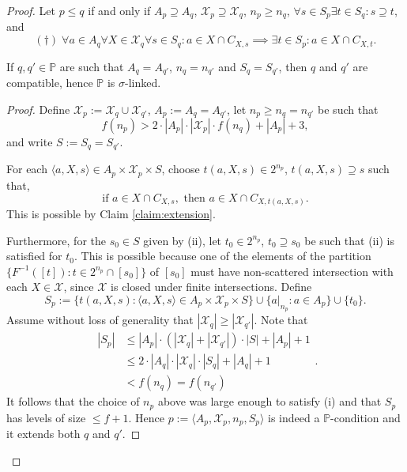 \documentclass[10pt,a4paper]{amsart}
\begin{document}
\begin{proof}
Let $p \leq q$ if and only if $A_p \supseteq A_q$, $\mathcal{X}_p \supseteq \mathcal{X}_q$, $n_p \geq n_q$, $\forall s \in S_p \exists t \in S_q: s \supseteq t$, and
\[(\dagger)\; \forall a \in A_q \forall X \in \mathcal{X}_q \forall s \in S_q: a \in X \cap C_{X,s} \implies \exists t \in S_p: a \in X \cap C_{X,t}.\]

\begin{claim}\label{claim:linked}
	If $q,q' \in \mathbb{P}$ are such that $A_q =A_{q'}$, $n_q=n_{q'}$ and $S_q=S_{q'}$, then $q$ and $q'$ are compatible, hence $\mathbb{P}$ is $\sigma$-linked.
\end{claim}

\begin{proof}
Define $\mathcal{X}_{p}:=\mathcal{X}_{q} \cup \mathcal{X}_{q'}$, $A_p:=A_q=A_{q'}$, let $n_p \geq n_q=n_{q'}$ be such that
\[f(n_p)> 2 \cdot |A_p|\cdot |\mathcal{X}_p| \cdot f(n_q) + |A_p| + 3,\]
and write $S:=S_q=S_{q'}$.

For each $\langle a, X, s\rangle \in A_p \times \mathcal{X}_p \times S$, choose $t(a,X,s)\in 2^{n_p}$, $t(a,X,s) \supseteq s$ such that,
\[\text{if } a \in X \cap C_{X,s}, \text{ then } a \in X \cap C_{X, t(a,X,s)}.\]
This is possible by Claim \ref{claim:extension}.

Furthermore, for the $s_0 \in S$ given by (ii), let $t_0 \in 2^{n_p}$,  $t_0 \supseteq s_0$ be such that (ii) is satisfied for $t_0$. This is possible because one of the elements of the partition $\{F^{-1}([t]): t \in 2^{n_p}\cap [s_0]\}$ of $[s_0]$ must have non-scattered intersection with each $X \in \mathcal{X}$, since $\mathcal{X}$ is closed under finite intersections. Define
\[S_p:=\{t(a,X,s): \langle a, X, s\rangle \in A_p \times \mathcal{X}_p \times S\} \cup \{a|_{n_p}: a \in A_p\} \cup \{t_0\}.\]
Assume without loss of generality that $|\mathcal{X}_q|\geq |\mathcal{X}_{q'}|$. Note that
\[\begin{aligned}
	|S_p|&\leq |A_p| \cdot (|\mathcal{X}_q|+|\mathcal{X}_{q'}|)\cdot |S|+|A_p|+1 \\
	&\leq 2 \cdot |A_q| \cdot |\mathcal{X}_q| \cdot |S_q|+|A_q|+1\\
	&< f(n_{q})=f(n_{q'})
\end{aligned}.\]
It follows that the choice of $n_p$ above was large enough to satisfy (i) and that $S_p$ has levels of size $\leq f+1$. Hence $p:=\langle A_p, \mathcal{X}_p, n_p, S_p\rangle$ is indeed a $\mathbb{P}$-condition and it extends both $q$ and $q'$.
\end{proof}


\end{proof}
\end{document}
